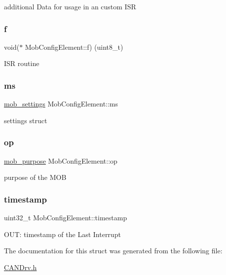 additional Data for usage in an custom I\+SR \hypertarget{struct_mob_config_element_aa841e041e2beab702a5575da5b8b3915}{}\label{struct_mob_config_element_aa841e041e2beab702a5575da5b8b3915} 
\subsubsection{\texorpdfstring{f}{f}}
{\footnotesize\ttfamily void($\ast$ Mob\+Config\+Element\+::f) (uint8\+\_\+t)}

I\+SR routine \hypertarget{struct_mob_config_element_a714796794c4e9552b2ab4d452c11b1cc}{}\label{struct_mob_config_element_a714796794c4e9552b2ab4d452c11b1cc} 
\subsubsection{\texorpdfstring{ms}{ms}}
{\footnotesize\ttfamily \hyperlink{structmob__settings}{mob\+\_\+settings} Mob\+Config\+Element\+::ms}

settings struct \hypertarget{struct_mob_config_element_ae38609249414f8dfeb6963cf809ec5b5}{}\label{struct_mob_config_element_ae38609249414f8dfeb6963cf809ec5b5} 
\subsubsection{\texorpdfstring{op}{op}}
{\footnotesize\ttfamily \hyperlink{_c_a_n_drv_8h_a96ec3cdb380b685d106b8ce4ff42eaf7}{mob\+\_\+purpose} Mob\+Config\+Element\+::op}

purpose of the M\+OB \hypertarget{struct_mob_config_element_ac1d741b833732292b163b0475363900a}{}\label{struct_mob_config_element_ac1d741b833732292b163b0475363900a} 
\subsubsection{\texorpdfstring{timestamp}{timestamp}}
{\footnotesize\ttfamily uint32\+\_\+t Mob\+Config\+Element\+::timestamp}

O\+UT\+: timestamp of the Last Interrupt 

The documentation for this struct was generated from the following file\+:\begin{DoxyCompactItemize}
\item 
\hyperlink{_c_a_n_drv_8h}{C\+A\+N\+Drv.\+h}\end{DoxyCompactItemize}

